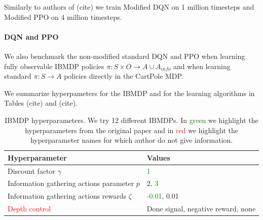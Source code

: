 Similarly to authors of (cite) we train Modified DQN on 1 million timesteps and Modified PPO on 4 million timesteps.

\paragraph{DQN and PPO} We also benchmark the non-modified standard DQN and PPO when learning fully observable IBMDP policies $\pi:S\times O\rightarrow A\cup A_{info}$ and when learning standard $\pi:S\rightarrow A$ policies directly in the CartPole MDP.

We summarize hyperpameters for the IBMDP and for the learning algorithms in Tables (cite) and (cite).

\begin{table}[h]
    \centering
    \caption{IBMDP hyperparameters. We try 12 different IBMDPs. In \textcolor{green}{green} we highlight the hyperparameters from the original paper and in \textcolor{red}{red} we highlight the hyperparameter names for which author do not give information.}
    \begin{tabular}{ll}
    \toprule
    \textbf{Hyperparameter} & \textbf{Values}\\
    \midrule
    Discount factor $\gamma$ & \textcolor{green}{1} \\
    Information gathering actions parameter $p$ & 2, \textcolor{green}{3} \\
    Information gathering actions rewards $\zeta$ & \textcolor{green}{-0.01}, 0.01 \\
    \textcolor{red}{Depth control} & Done signal, negative reward, none \\ 
    \bottomrule
    \end{tabular}
    \end{table}

